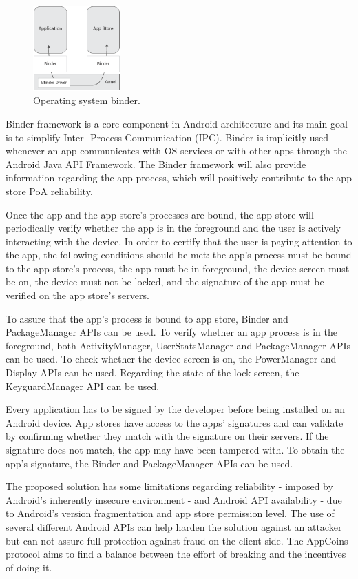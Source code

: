 \begin{figure}[!ht]
\centering
\includegraphics[width=0.3\textwidth]{diagrams/binder_diagram.eps}
\caption{Operating system binder.}
\label{fig:binder}
\end{figure}

Binder framework is a core component in Android architecture and its main goal is to simplify Inter-
Process Communication (IPC). Binder is implicitly used whenever an app communicates with OS 
services or with other apps through the Android Java API Framework. The Binder framework will also 
provide information regarding the app process, which will positively contribute to the app store 
\textsf{PoA} reliability.

Once the app and the app store's processes are bound, the app store will periodically verify whether 
the app is in the foreground and the user is actively interacting with the device. In order to certify that 
the user is paying attention to the app, the following conditions should be met: the app's process must be bound to the app store's process, the app must be in foreground, the device screen must be on, the device must not be locked, and the signature of the app must be verified on the app store's servers.

To assure that the app's process is bound to app store, Binder and PackageManager APIs can be used. 
To verify whether an app process is in the foreground, both ActivityManager, UserStatsManager and  PackageManager APIs can be used. To check whether the device screen is on, the PowerManager 
and Display APIs can be used. Regarding the state of the lock screen, the KeyguardManager API can 
be used. 

Every application has to be signed by the developer before being installed on an Android device. App 
stores have access to the apps' signatures and can validate by confirming whether they match with the 
signature on their servers. If the signature does not match, the app may have been tampered with. To obtain the app's signature, the Binder and PackageManager APIs can be used.

The proposed solution has some limitations regarding reliability - imposed by Android's inherently 
insecure environment - and Android API availability - due to Android's version fragmentation and app 
store permission level. The use of several different Android APIs can help harden the solution 
against an attacker but can not assure full protection against fraud on the client side. The AppCoins protocol aims to find a balance between the effort of breaking and the incentives of doing it.

